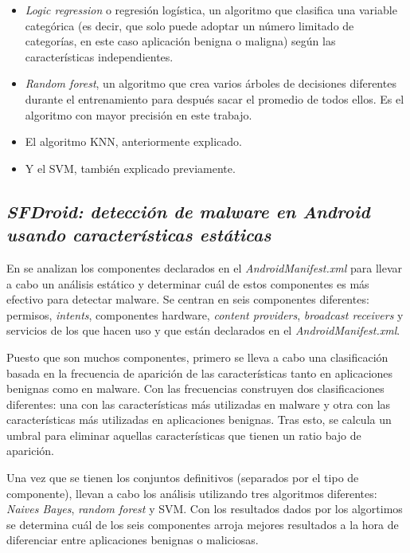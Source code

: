 \begin{itemize}
	\item \textit{Logic regression} o regresión logística, un algoritmo que clasifica una variable categórica (es decir, que solo puede adoptar un número limitado de categorías, en este caso aplicación benigna o maligna) según las características independientes.
	\item \textit{Random forest}, un algoritmo que crea varios árboles de decisiones diferentes durante el entrenamiento para después sacar el promedio de todos ellos. Es el algoritmo con mayor precisión en este trabajo.
	\item El algoritmo KNN, anteriormente explicado.
	\item Y el SVM, también explicado previamente.
\end{itemize}

\subsection{\textit{SFDroid: detección de malware en Android usando características estáticas}}

En \hypersetup{citecolor=red}\cite{garg} se analizan los componentes declarados en el \textit{AndroidManifest.xml} para llevar a cabo un análisis estático y determinar cuál de estos componentes es más efectivo para detectar malware. Se centran en seis componentes diferentes: permisos, \textit{intents}, componentes hardware, \textit{content providers}, \textit{broadcast receivers} y servicios de los que hacen uso y que están declarados en el \textit{AndroidManifest.xml}.

Puesto que son muchos componentes, primero se lleva a cabo una clasificación basada en la frecuencia de aparición de las características tanto en aplicaciones benignas como en malware. Con las frecuencias construyen dos clasificaciones diferentes: una con las características más utilizadas en malware y otra con las características más utilizadas en aplicaciones benignas. Tras esto, se calcula un umbral para eliminar aquellas características que tienen un ratio bajo de aparición.

Una vez que se tienen los conjuntos definitivos (separados por el tipo de componente), llevan a cabo los análisis utilizando tres algoritmos diferentes: \textit{Naives Bayes}, \textit{random forest} y SVM. Con los resultados dados por los algortimos se determina cuál de los seis componentes arroja mejores resultados a la hora de diferenciar entre aplicaciones benignas o maliciosas.

